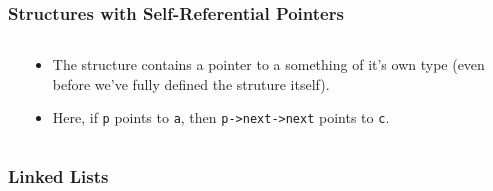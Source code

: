 
\begin{frame}[fragile]
\frametitle{Structures with Self-Referential Pointers}
\begin{columns}[T]

\begin{column}{0.45\textwidth}

\end{column}

\pause
\begin{column}{0.45\textwidth}
\begin{itemize}[<+->]
\item The structure contains a pointer to a something of it's own type (even before we've fully defined the struture itself).
\item Here, if \verb^p^ points to \verb^a^, then \verb^p->next->next^ points to \verb^c^.
\end{itemize}
\end{column}

\end{columns}
\end{frame}



\begin{frame}[fragile]
\frametitle{Linked Lists}
\begin{columns}[T]

\begin{column}{0.45\textwidth}

\end{column}

\pause
\begin{column}{0.45\textwidth}

\end{column}

\end{columns}
\end{frame}


